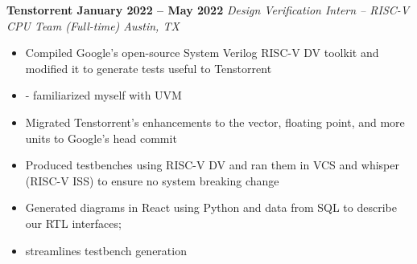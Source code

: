 \documentclass[../main.tex]{subfiles}
\begin{document}
%
\noindent\textbf{{\fontsize{\textFontSize}{\textFontBox}\selectfont Tenstorrent \hfill January 2022 – May 2022}}
\vspace{\jobHeaderDist}\newline
%
{\fontsize{\textFontSize}{\textFontBox}\selectfont\emph{Design Verification Intern – RISC-V CPU Team (Full-time) \hfill Austin, TX \hspace{0 cm}}}\vspace{\listHeight}\newline
%
%
\begin{itemize}
  \setlength{\itemindent}{-6mm}
  \vspace{\listItemDist}\item {\fontsize{\textFontSize}{\textFontBox}\selectfont Compiled Google’s open-source System Verilog RISC-V DV toolkit and modified it to generate tests useful to Tenstorrent}
  \vspace{\listItemDistTwo}\item {\fontsize{\textFontSize}{\textFontBox}\selectfont - familiarized myself with UVM}
  \vspace{\listItemDistTwo}\item {\fontsize{\textFontSize}{\textFontBox}\selectfont Migrated Tenstorrent’s enhancements to the vector, floating point, and more units to Google’s head commit}
  \vspace{\listItemDistTwo}\item {\fontsize{\textFontSize}{\textFontBox}\selectfont Produced testbenches using RISC-V DV and ran them in VCS and whisper (RISC-V ISS) to ensure no system breaking change}
  \vspace{-9 mm}\item {\fontsize{\textFontSize}{\textFontBox}\selectfont Generated diagrams in React using Python and data from SQL to describe our RTL interfaces;}
  \vspace{\listItemDistTwo}\item {\fontsize{\textFontSize}{\textFontBox}\selectfont streamlines testbench generation}
\end{itemize}
%
%
%
\end{document}
